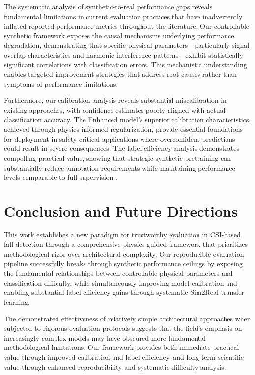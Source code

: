 \documentclass[10pt,conference]{IEEEtran}
\begin{document}
The systematic analysis of synthetic-to-real performance gaps reveals fundamental limitations in current evaluation practices that have inadvertently inflated reported performance metrics throughout the literature. Our controllable synthetic framework exposes the causal mechanisms underlying performance degradation, demonstrating that specific physical parameters—particularly signal overlap characteristics and harmonic interference patterns—exhibit statistically significant correlations with classification errors. This mechanistic understanding enables targeted improvement strategies that address root causes rather than symptoms of performance limitations.

Furthermore, our calibration analysis reveals substantial miscalibration in existing approaches, with confidence estimates poorly aligned with actual classification accuracy. The Enhanced model's superior calibration characteristics, achieved through physics-informed regularization, provide essential foundations for deployment in safety-critical applications where overconfident predictions could result in severe consequences. The label efficiency analysis demonstrates compelling practical value, showing that strategic synthetic pretraining can substantially reduce annotation requirements while maintaining performance levels comparable to full supervision \cite{fernandez2024wavelet}.

\section{Conclusion and Future Directions}

This work establishes a new paradigm for trustworthy evaluation in CSI-based fall detection through a comprehensive physics-guided framework that prioritizes methodological rigor over architectural complexity. Our reproducible evaluation pipeline successfully breaks through synthetic performance ceilings by exposing the fundamental relationships between controllable physical parameters and classification difficulty, while simultaneously improving model calibration and enabling substantial label efficiency gains through systematic Sim2Real transfer learning.

The demonstrated effectiveness of relatively simple architectural approaches when subjected to rigorous evaluation protocols suggests that the field's emphasis on increasingly complex models may have obscured more fundamental methodological limitations. Our framework provides both immediate practical value through improved calibration and label efficiency, and long-term scientific value through enhanced reproducibility and systematic difficulty analysis.
\end{document}
